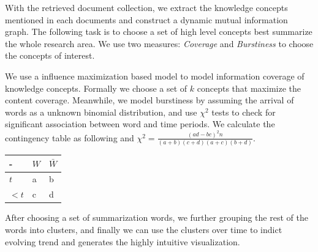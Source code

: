 \documentclass[portrait,final,a0paper,fontscale=0.277]{baposter}
\begin{document}
\begin{poster}
{With the retrieved document collection, we extract the knowledge concepts mentioned in each documents and construct a dynamic mutual information graph. The following task is to choose a set of high level concepts best summarize the whole research area. We use two measures: \emph{Coverage} and \emph{Burstiness} to choose the concepts of interest.




We use a influence maximization based model to model information coverage of knowledge concepts. Formally we choose a set of $k$ concepts that maximize the content coverage. Meanwhile, we model burstiness by assuming the arrival of words as a unknown binomial distribution, and use $\chi^2$ tests to check for significant association between word and time periods. We calculate the contingency table as following and $\chi^2 = \frac{(ad-bc)^2n}{(a+b)(c+d)(a+c)(b+d)}$.
\begin{center}
\begin{tabularx}{0.5\textwidth}{ |X|X|X| }
  \hline
  - & $W$ & $\bar{W}$ \\
  \hline
  $t$  & a  & b  \\
  \hline
  $<t$  & c  & d  \\
  \hline
\end{tabularx}
\end{center}

After choosing a set of summarization words, we further grouping the rest of the words into clusters, and finally we can use the clusters over time to indict evolving trend and generates the highly intuitive visualization.

}

\end{poster}
\end{document}
